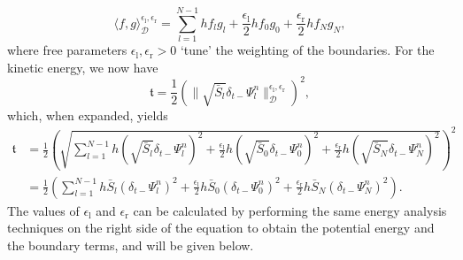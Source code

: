 \documentclass[dvipsnames]{article}
\def\Psiln{\Psi_l^n}
\begin{document}
\begin{equation}\label{eq:weightedInnerProduct}
    \langle f,g \rangle_{\mathcal{D}}^{\epsilon_\text{l}, \epsilon_\text{r}}= \sum_{l = 1}^{N-1}hf_lg_l + \frac{\epsilon_\text{l}}{2}hf_0g_0 + \frac{\epsilon_\text{r}}{2}hf_Ng_N,
\end{equation}
where free parameters $\epsilon_\text{l}, \epsilon_\text{r} > 0$ `tune' the weighting of the boundaries. For the kinetic energy, we now have
\begin{equation}
    \mathfrak{t} = \frac{1}{2}\left(\lVert\sqrt{\bar S_l}\delta_{t-}\Psiln \rVert_\mathcal{D}^{\epsilon_\text{l}, \epsilon_\text{r}}\right)^2,
\end{equation}
which, when expanded, yields
\begin{align}
    \mathfrak{t} &= \frac{1}{2}\left(\sqrt{\sum_{l=1}^{N-1}h\left(\sqrt{\bar S_l}\delta_{t-}\Psiln\right)^2 + \frac{\epsilon_\text{l}}{2}h\left(\sqrt{\bar S_0 }\delta_{t-}\Psi_0^n\right)^2 + \frac{\epsilon_\text{r}}{2}h\left(\sqrt{\bar S_N }\delta_{t-}\Psi_N^n\right)^2}\right)^2\nonumber\\
     &=\frac{1}{2}\left(\sum_{l=1}^{N-1}h\bar S_l(\delta_{t-}\Psiln)^2 + \frac{\epsilon_\text{l}}{2}h\bar S_0 (\delta_{t-}\Psi_0^n)^2 + \frac{\epsilon_\text{r}}{2}h\bar S_N (\delta_{t-}\Psi_N^n)^2\right)    .
\end{align}
The values of $\epsilon_\text{l}$ and $\epsilon_\text{r}$ can be calculated by performing the same energy analysis techniques on the right side of the equation to obtain the potential energy and the boundary terms, and will be given below.
\end{document}
